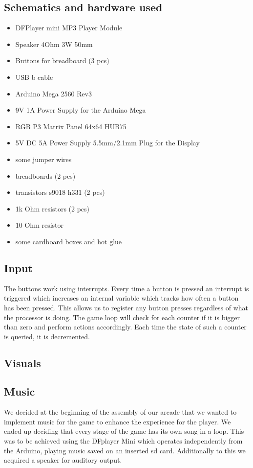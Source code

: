 \documentclass[10pt, a4paper]{article}
\begin{document}
\subsection*{Schematics and hardware used}
\begin{itemize}
    \item DFPlayer mini MP3 Player Module
    \item Speaker 4Ohm 3W 50mm
    \item Buttons for breadboard (3 pcs)
    \item USB b cable
    \item Arduino Mega 2560 Rev3
    \item 9V 1A Power Supply for the Arduino Mega
    \item RGB P3 Matrix Panel 64x64 HUB75
    \item 5V DC 5A Power Supply 5.5mm/2.1mm Plug for the Display
    \item some jumper wires
    \item breadboards (2 pcs)
    \item transistors s9018 h331 (2 pcs)
    \item 1k Ohm resistors (2 pcs)
    \item 10 Ohm resistor
    \item some cardboard boxes and hot glue
\end{itemize}

\subsection*{Input}
The buttons work using interrupts. Every time a button is pressed an interrupt is triggered which increases an internal variable which tracks how often a button has been pressed. This allows us to register any button presses regardless of what the processor is doing. The game loop will check for each counter if it is bigger than zero and perform actions accordingly. Each time the state of such a counter is queried, it is decremented.

\subsection*{Visuals}

\subsection*{Music}
We decided at the beginning of the assembly of our arcade that we wanted to implement music for the game to enhance the experience for the player. We ended up deciding that every stage of the game has its own song in a loop. This was to be achieved using the DFplayer Mini which operates independently from the Arduino, playing music saved on an inserted sd card. Additionally to this we acquired a speaker for auditory output.
\end{document}
